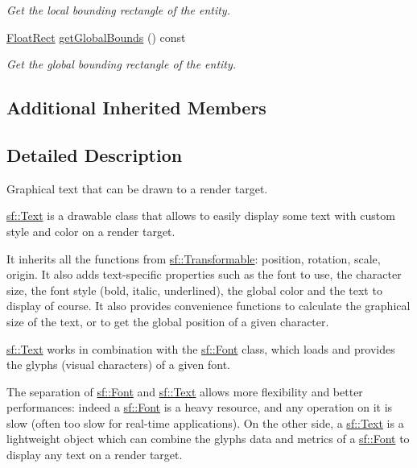 \begin{DoxyCompactItemize}
\begin{DoxyCompactList}\small\item\em Get the local bounding rectangle of the entity. \end{DoxyCompactList}\item 
\hyperlink{classsf_1_1_rect}{Float\+Rect} \hyperlink{classsf_1_1_text_a95d732f58bd12bf7ec388b106f3729ba}{get\+Global\+Bounds} () const 
\begin{DoxyCompactList}\small\item\em Get the global bounding rectangle of the entity. \end{DoxyCompactList}\end{DoxyCompactItemize}
\subsection*{Additional Inherited Members}


\subsection{Detailed Description}
Graphical text that can be drawn to a render target. 

\hyperlink{classsf_1_1_text}{sf\+::\+Text} is a drawable class that allows to easily display some text with custom style and color on a render target.

It inherits all the functions from \hyperlink{classsf_1_1_transformable}{sf\+::\+Transformable}\+: position, rotation, scale, origin. It also adds text-\/specific properties such as the font to use, the character size, the font style (bold, italic, underlined), the global color and the text to display of course. It also provides convenience functions to calculate the graphical size of the text, or to get the global position of a given character.

\hyperlink{classsf_1_1_text}{sf\+::\+Text} works in combination with the \hyperlink{classsf_1_1_font}{sf\+::\+Font} class, which loads and provides the glyphs (visual characters) of a given font.

The separation of \hyperlink{classsf_1_1_font}{sf\+::\+Font} and \hyperlink{classsf_1_1_text}{sf\+::\+Text} allows more flexibility and better performances\+: indeed a \hyperlink{classsf_1_1_font}{sf\+::\+Font} is a heavy resource, and any operation on it is slow (often too slow for real-\/time applications). On the other side, a \hyperlink{classsf_1_1_text}{sf\+::\+Text} is a lightweight object which can combine the glyphs data and metrics of a \hyperlink{classsf_1_1_font}{sf\+::\+Font} to display any text on a render target.

